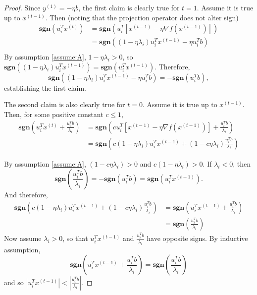 \documentclass[11pt]{article}
\begin{document}
\begin{proof}
Since $y^{(1)} = -\eta b$, the first claim is clearly true for $t = 1$. Assume it is true up to $x^{(t-1)}$. Then (noting that the projection operator does not alter sign)
\begin{align*}
\mathbf{sgn}(u_i^Tx^{(t)}) &= \mathbf{sgn}\left(u_i^T\left[ x^{(t-1)} - \eta \nabla f(x^{(t-1)})\right] \right) \\
					&= \mathbf{sgn}\left( (1 - \eta \lambda_i)u_i^Tx^{(t-1)} - \eta u_i^Tb\right) \\
\end{align*}
By assumption \ref{assume:A}, $1 - \eta \lambda_i > 0$, so $\mathbf{sgn}\left( (1 - \eta \lambda_i)u_i^Tx^{(t-1)}\right) = \mathbf{sgn}\left(u_i^Tx^{(t-1)}\right)$. Therefore,
\[
\mathbf{sgn}\left( (1 - \eta \lambda_i)u_i^Tx^{(t-1)} - \eta u_i^Tb\right) = -\mathbf{sgn}(u_i^Tb),
\]
establishing the first claim.

The second claim is also clearly true for $t = 0$. Assume it is true up to $x^{(t-1)}$. Then, for some positive constant $c \leq1$,
\begin{align*}
\mathbf{sgn}\left(u_i^Tx^{(t)} + \frac{u_i^Tb}{\lambda_i}\right)  
	&= \mathbf{sgn}\left(c u_i^T\left[ x^{(t-1)} - \eta \nabla f(x^{(t-1)}) \right] + \frac{u_i^Tb}{\lambda_i}\right) \\
	&= \mathbf{sgn}\left(c(1 - \eta \lambda_i)u_i^Tx^{(t-1)} + (1 - c\eta \lambda_i) \frac{u_i^Tb}{\lambda_i} \right)
\end{align*}

By assumption \ref{assume:A}, $(1 - c\eta \lambda_i) > 0$ and $c(1 - \eta \lambda_i) > 0$. If $\lambda_i < 0$, then
\[ \mathbf{sgn}\left(\frac{u_i^Tb}{\lambda_i}\right) = - \mathbf{sgn}(u_i^Tb) = \mathbf{sgn}(u_i^Tx^{(t-1)}). \]
And therefore, 
\begin{align*}
\mathbf{sgn}\left(c(1 - \eta \lambda_i)u_i^Tx^{(t-1)} + (1 - c\eta \lambda_i) \frac{u_i^Tb}{\lambda_i} \right)
	&= \mathbf{sgn}\left(u_i^Tx^{(t-1)} + \frac{u_i^Tb}{\lambda_i}\right) \\
	&= \mathbf{sgn}\left(\frac{u_i^Tb}{\lambda_i}\right) 
\end{align*}
Now assume $\lambda_i > 0$, so that $u_i^Tx^{(t-1)}$ and $\frac{u_i^Tb}{\lambda_i}$ have opposite signs. By inductive assumption,
\[ \mathbf{sgn}\left(u_i^Tx^{(t-1)} + \frac{u_i^Tb}{\lambda_i}\right) = \mathbf{sgn}\left( \frac{u_i^Tb}{\lambda_i}\right) \]
and so $\left| u_i^Tx^{(t-1)} \right| < \left| \frac{u_i^Tb}{\lambda_i} \right|$.


\end{proof}
\end{document}
